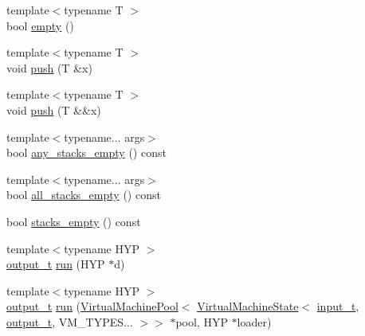 \begin{DoxyCompactItemize}
\item 
{\footnotesize template$<$typename T $>$ }\\bool \hyperlink{class_virtual_machine_state_afd9734eba9ba7bb9bbf4926743c90a3a}{empty} ()
\item 
{\footnotesize template$<$typename T $>$ }\\void \hyperlink{class_virtual_machine_state_a7284f92013c7258d2d18ba238441c1a6}{push} (T \&x)
\item 
{\footnotesize template$<$typename T $>$ }\\void \hyperlink{class_virtual_machine_state_a1f7aab5a5bb3b9cc4d79b50f6191ed36}{push} (T \&\&x)
\item 
{\footnotesize template$<$typename... args$>$ }\\bool \hyperlink{class_virtual_machine_state_a278567110ec6538566a8f6ed50bdd423}{any\+\_\+stacks\+\_\+empty} () const
\item 
{\footnotesize template$<$typename... args$>$ }\\bool \hyperlink{class_virtual_machine_state_a898acaa81e6385a26100847ab7232213}{all\+\_\+stacks\+\_\+empty} () const
\item 
bool \hyperlink{class_virtual_machine_state_a08cc1e3bf25e9bf58f798102e364856a}{stacks\+\_\+empty} () const
\item 
{\footnotesize template$<$typename H\+YP $>$ }\\\hyperlink{class_virtual_machine_state_a005a025f97d9505b00e7f9f0e99002bb}{output\+\_\+t} \hyperlink{class_virtual_machine_state_a815d2e072590b97e314aa947130efb70}{run} (H\+YP $\ast$d)
\item 
{\footnotesize template$<$typename H\+YP $>$ }\\\hyperlink{class_virtual_machine_state_a005a025f97d9505b00e7f9f0e99002bb}{output\+\_\+t} \hyperlink{class_virtual_machine_state_ace435c4110cc54a8952c9003f37effe7}{run} (\hyperlink{class_virtual_machine_pool}{Virtual\+Machine\+Pool}$<$ \hyperlink{class_virtual_machine_state}{Virtual\+Machine\+State}$<$ \hyperlink{class_virtual_machine_state_a04c5592dddd5b9ffdae5a509d73127dd}{input\+\_\+t}, \hyperlink{class_virtual_machine_state_a005a025f97d9505b00e7f9f0e99002bb}{output\+\_\+t}, V\+M\+\_\+\+T\+Y\+P\+E\+S... $>$$>$ $\ast$pool, H\+YP $\ast$loader)
\end{DoxyCompactItemize}

